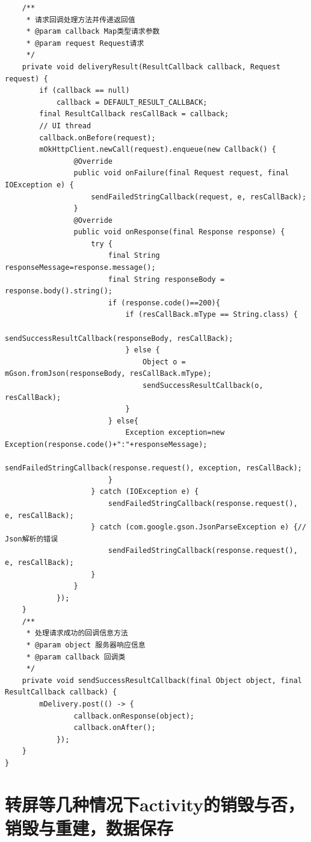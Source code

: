 \documentclass[9pt, b5paper]{article}
\begin{document}
\begin{verbatim}
    /**
     * 请求回调处理方法并传递返回值
     * @param callback Map类型请求参数
     * @param request Request请求
     */
    private void deliveryResult(ResultCallback callback, Request request) {
        if (callback == null)
            callback = DEFAULT_RESULT_CALLBACK;
        final ResultCallback resCallBack = callback;
        // UI thread
        callback.onBefore(request);
        mOkHttpClient.newCall(request).enqueue(new Callback() {
                @Override
                public void onFailure(final Request request, final IOException e) {
                    sendFailedStringCallback(request, e, resCallBack);
                }
                @Override
                public void onResponse(final Response response) {
                    try {
                        final String responseMessage=response.message();
                        final String responseBody = response.body().string();
                        if (response.code()==200){
                            if (resCallBack.mType == String.class) {
                                sendSuccessResultCallback(responseBody, resCallBack);
                            } else {
                                Object o = mGson.fromJson(responseBody, resCallBack.mType);
                                sendSuccessResultCallback(o, resCallBack);
                            }
                        } else{
                            Exception exception=new Exception(response.code()+":"+responseMessage);
                            sendFailedStringCallback(response.request(), exception, resCallBack);
                        }
                    } catch (IOException e) {
                        sendFailedStringCallback(response.request(), e, resCallBack);
                    } catch (com.google.gson.JsonParseException e) {// Json解析的错误
                        sendFailedStringCallback(response.request(), e, resCallBack);
                    }
                }
            });
    }
    /**
     * 处理请求成功的回调信息方法
     * @param object 服务器响应信息
     * @param callback 回调类
     */
    private void sendSuccessResultCallback(final Object object, final      ResultCallback callback) {
        mDelivery.post(() -> {
                callback.onResponse(object);
                callback.onAfter();
            });
    }
}
\end{verbatim}

\section{转屏等几种情况下activity的销毁与否，销毁与重建，数据保存}
\label{sec-14}
\end{document}
